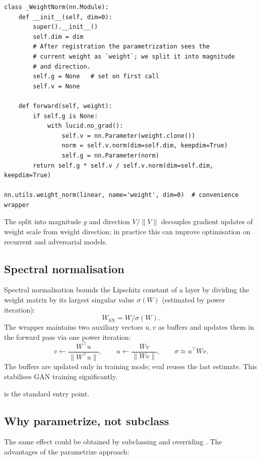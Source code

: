 \begin{lstlisting}[style=lucid,language=LucidPython]
class _WeightNorm(nn.Module):
    def __init__(self, dim=0):
        super().__init__()
        self.dim = dim
        # After registration the parametrization sees the
        # current weight as `weight`; we split it into magnitude
        # and direction.
        self.g = None   # set on first call
        self.v = None

    def forward(self, weight):
        if self.g is None:
            with lucid.no_grad():
                self.v = nn.Parameter(weight.clone())
                norm = self.v.norm(dim=self.dim, keepdim=True)
                self.g = nn.Parameter(norm)
        return self.g * self.v / self.v.norm(dim=self.dim, keepdim=True)

nn.utils.weight_norm(linear, name='weight', dim=0)  # convenience wrapper
\end{lstlisting}

The split into magnitude $g$ and direction $V / \|V\|$
decouples gradient updates of weight scale from weight
direction; in practice this can improve optimisation on
recurrent and adversarial models.

\subsection{Spectral normalisation}
\label{ssec:module_system:spectral_norm}

Spectral normalisation \cite{miyato_specnorm_2018} bounds the
Lipschitz constant of a layer by dividing the weight matrix by
its largest singular value $\sigma(W)$ (estimated by power
iteration):
\[
  W_{\text{SN}} = W / \sigma(W).
\]
The wrapper maintains two auxiliary vectors $u, v$ as buffers
and updates them in the forward pass via one power iteration:
\[
  v \gets \frac{W^\top u}{\|W^\top u\|}, \qquad
  u \gets \frac{W v}{\|W v\|}, \qquad
  \sigma \approx u^\top W v.
\]
The buffers are updated only in training mode; eval reuses the
last estimate. This stabilises GAN training significantly.

is the standard entry point.

\subsection{Why parametrize, not subclass}
\label{ssec:module_system:why_parametrize}

The same effect could be obtained by subclassing
 and overriding . The advantages
of the parametrize approach:


